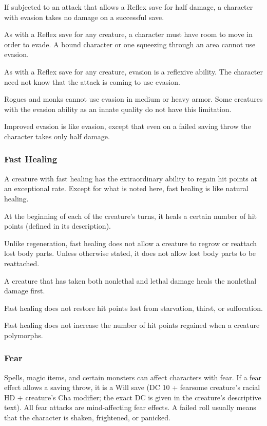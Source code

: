 If subjected to an attack that allows a Reflex save for half damage, a character with evasion takes no damage on a successful save.

As with a Reflex save for any creature, a character must have room to move in order to evade. A bound character or one squeezing through an area cannot use evasion.

As with a Reflex save for any creature, evasion is a reflexive ability. The character need not know that the attack is coming to use evasion.

Rogues and monks cannot use evasion in medium or heavy armor. Some creatures with the evasion ability as an innate quality do not have this limitation.

Improved evasion is like evasion, except that even on a failed saving throw the character takes only half damage.

\subsubsection{Fast Healing}
A creature with fast healing has the extraordinary ability to regain hit points at an exceptional rate. Except for what is noted here, fast healing is like natural healing.

At the beginning of each of the creature's turns, it heals a certain number of hit points (defined in its description).

Unlike regeneration, fast healing does not allow a creature to regrow or reattach lost body parts. Unless otherwise stated, it does not allow lost body parts to be reattached.

A creature that has taken both nonlethal and lethal damage heals the nonlethal damage first.

Fast healing does not restore hit points lost from starvation, thirst, or suffocation.

Fast healing does not increase the number of hit points regained when a creature polymorphs.

\subsubsection{Fear}
Spells, magic items, and certain monsters can affect characters with fear. If a fear effect allows a saving throw, it is a Will save (DC 10 + \onehalf fearsome creature's racial HD + creature's Cha modifier; the exact DC is given in the creature's descriptive text). All fear attacks are mind-affecting fear effects. A failed roll usually means that the character is shaken, frightened, or panicked.

